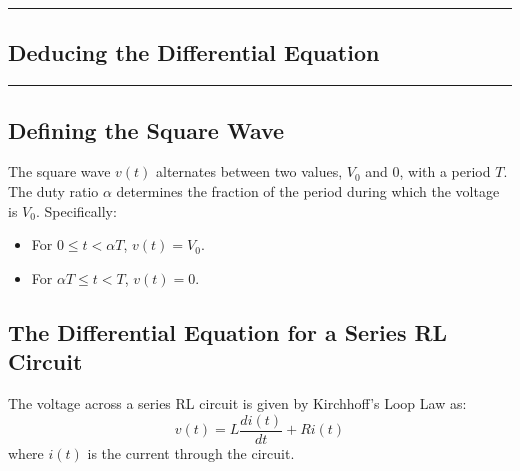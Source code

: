 \newpage
{\color{gray}\hrule}
\begin{center}
\section{Deducing the Differential Equation}
\bigskip
\end{center}
{\color{gray}\hrule}
\begin{multicols}{2}

\subsection{Defining the Square Wave}
The square wave \(v(t)\) alternates between two values, \(V_0\) and 0, with a period \(T\). The duty ratio \(\alpha\) determines the fraction of the period during which the voltage is \(V_0\). Specifically:
\begin{itemize}
    \item For \(0 \leq t < \alpha T\), \(v(t) = V_0\).
    \item For \(\alpha T \leq t < T\), \(v(t) = 0\).
\end{itemize}

\subsection{The Differential Equation for a Series RL Circuit}
The voltage across a series RL circuit is given by Kirchhoff's Loop Law as:
\[
v(t) = L \frac{di(t)}{dt} + R i(t)
\]
where \(i(t)\) is the current through the circuit.


\end{multicols}

